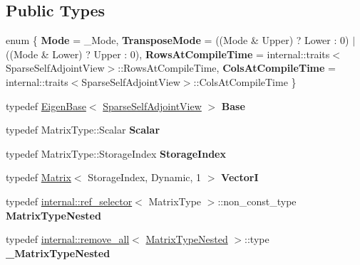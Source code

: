 \subsection*{Public Types}
\begin{DoxyCompactItemize}
\item 
\mbox{\label{class_eigen_1_1_sparse_self_adjoint_view_ac1f05b9a99328191ef57830215ce8286}} 
enum \{ {\bfseries Mode} = \+\_\+\+Mode, 
{\bfseries Transpose\+Mode} = ((Mode \& Upper) ? Lower \+: 0) $\vert$ ((Mode \& Lower) ? Upper \+: 0), 
{\bfseries Rows\+At\+Compile\+Time} = internal\+::traits$<$Sparse\+Self\+Adjoint\+View$>$\+::Rows\+At\+Compile\+Time, 
{\bfseries Cols\+At\+Compile\+Time} = internal\+::traits$<$Sparse\+Self\+Adjoint\+View$>$\+::Cols\+At\+Compile\+Time
 \}
\item 
\mbox{\label{class_eigen_1_1_sparse_self_adjoint_view_ac296adf416c473239ff08544cc26101a}} 
typedef \mbox{\hyperlink{struct_eigen_1_1_eigen_base}{Eigen\+Base}}$<$ \mbox{\hyperlink{class_eigen_1_1_sparse_self_adjoint_view}{Sparse\+Self\+Adjoint\+View}} $>$ {\bfseries Base}
\item 
\mbox{\label{class_eigen_1_1_sparse_self_adjoint_view_aba840da2fc87053f6512fe38323809b7}} 
typedef Matrix\+Type\+::\+Scalar {\bfseries Scalar}
\item 
\mbox{\label{class_eigen_1_1_sparse_self_adjoint_view_a5d5f3fb28a2ea508c5ca2223bb2dfd5c}} 
typedef Matrix\+Type\+::\+Storage\+Index {\bfseries Storage\+Index}
\item 
\mbox{\label{class_eigen_1_1_sparse_self_adjoint_view_a2489290b4e528ecf2f1222bc379a290c}} 
typedef \mbox{\hyperlink{class_eigen_1_1_matrix}{Matrix}}$<$ Storage\+Index, Dynamic, 1 $>$ {\bfseries VectorI}
\item 
\mbox{\label{class_eigen_1_1_sparse_self_adjoint_view_ad69bde509ee3b6f90d53eed97b1b0682}} 
typedef \mbox{\hyperlink{struct_eigen_1_1internal_1_1ref__selector}{internal\+::ref\+\_\+selector}}$<$ Matrix\+Type $>$\+::non\+\_\+const\+\_\+type {\bfseries Matrix\+Type\+Nested}
\item 
\mbox{\label{class_eigen_1_1_sparse_self_adjoint_view_a586093321f7586a0a4f704bca957d6f1}} 
typedef \mbox{\hyperlink{struct_eigen_1_1internal_1_1remove__all}{internal\+::remove\+\_\+all}}$<$ \mbox{\hyperlink{struct_eigen_1_1internal_1_1true__type}{Matrix\+Type\+Nested}} $>$\+::type {\bfseries \+\_\+\+Matrix\+Type\+Nested}
\end{DoxyCompactItemize}
